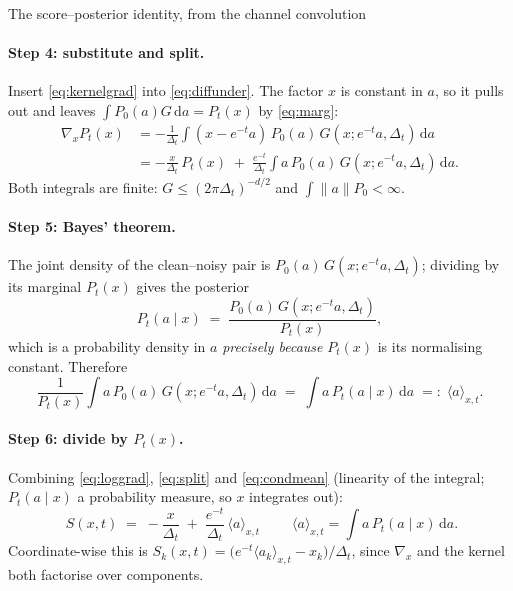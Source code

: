 \begin{toolbox}[tb:sm-tweedie]{The score--posterior identity, from the channel convolution}
\paragraph{Step 4: substitute and split.}
Insert \eqref{eq:kernelgrad} into \eqref{eq:diffunder}. The factor $x$ is constant in $a$,
so it pulls out and leaves $\int P_0(a)G\,\mathrm da=P_t(x)$ by \eqref{eq:marg}:
\begin{align}
  \nabla_x P_t(x)
  &= -\frac{1}{\Delta_t}\int (x-e^{-t}a)\,P_0(a)\,G(x;e^{-t}a,\Delta_t)\,\mathrm da
  \nonumber\\[2pt]
  &= -\frac{x}{\Delta_t}\,P_t(x)
     \;+\;\frac{e^{-t}}{\Delta_t}\int a\,P_0(a)\,G(x;e^{-t}a,\Delta_t)\,\mathrm da .
  \label{eq:split}
\end{align}
Both integrals are finite: $G\le(2\pi\Delta_t)^{-d/2}$ and $\int\lVert a\rVert P_0<\infty$.

\paragraph{Step 5: Bayes' theorem.}
The joint density of the clean--noisy pair is $P_0(a)\,G(x;e^{-t}a,\Delta_t)$; dividing by
its marginal $P_t(x)$ gives the posterior
\begin{equation}
  P_t(a\mid x)\;=\;\frac{P_0(a)\,G(x;e^{-t}a,\Delta_t)}{P_t(x)} ,
  \label{eq:posterior}
\end{equation}
which is a probability density in $a$ \emph{precisely because} $P_t(x)$ is its normalising
constant. Therefore
\begin{equation}
  \frac{1}{P_t(x)}\int a\,P_0(a)\,G(x;e^{-t}a,\Delta_t)\,\mathrm da
  \;=\;\int a\,P_t(a\mid x)\,\mathrm da\;=:\;\langle a\rangle_{x,t}.
  \label{eq:condmean}
\end{equation}

\paragraph{Step 6: divide by $P_t(x)$.}
Combining \eqref{eq:loggrad}, \eqref{eq:split} and \eqref{eq:condmean}
(linearity of the integral; $P_t(a\mid x)$ a probability measure, so $x$ integrates out):
\begin{equation}
  \boxed{\;S(x,t)\;=\;-\frac{x}{\Delta_t}\;+\;\frac{e^{-t}}{\Delta_t}\,\langle a\rangle_{x,t}\;}
  \qquad
  \langle a\rangle_{x,t}=\int a\,P_t(a\mid x)\,\mathrm da .
  \label{eq:tweedie-tb}
\end{equation}
Coordinate-wise this is $S_k(x,t)=\big(e^{-t}\langle a_k\rangle_{x,t}-x_k\big)/\Delta_t$,
since $\nabla_x$ and the kernel both factorise over components.


\end{toolbox}
